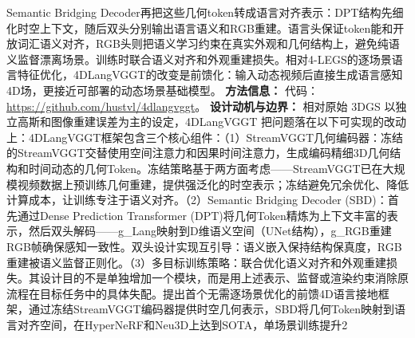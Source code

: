 Semantic Bridging Decoder再把这些几何token转成语言对齐表示：DPT结构先细化时空上下文，随后双头分别输出语言语义和RGB重建。语言头保证token能和开放词汇语义对齐，RGB头则把语义学习约束在真实外观和几何结构上，避免纯语义监督漂离场景。训练时联合语义对齐和外观重建损失。相对4-LEGS的逐场景语言特征优化，4DLangVGGT的改变是前馈化：输入动态视频后直接生成语言感知4D场，更接近可部署的动态场景基础模型。
\textbf{方法信息：} 代码：\url{https://github.com/hustvl/4dlangvggt}。
\textbf{设计动机与边界：} 相对原始 3DGS 以独立高斯和图像重建误差为主的设定，4DLangVGGT 把问题落在以下可实现的改动上：4DLangVGGT框架包含三个核心组件：（1）StreamVGGT几何编码器：冻结的StreamVGGT交替使用空间注意力和因果时间注意力，生成编码精细3D几何结构和时间动态的几何Token。冻结策略基于两方面考虑——StreamVGGT已在大规模视频数据上预训练几何重建，提供强泛化的时空表示；冻结避免冗余优化、降低计算成本，让训练专注于语义对齐。（2）Semantic Bridging Decoder (SBD)：首先通过Dense Prediction Transformer (DPT)将几何Token精炼为上下文丰富的表示，然后双头解码——g\_Lang映射到D维语义空间（UNet结构），g\_RGB重建RGB帧确保感知一致性。双头设计实现互引导：语义嵌入保持结构保真度，RGB重建被语义监督正则化。（3）多目标训练策略：联合优化语义对齐和外观重建损失。其设计目的不是单独增加一个模块，而是用上述表示、监督或渲染约束消除原流程在目标任务中的具体失配。提出首个无需逐场景优化的前馈4D语言接地框架，通过冻结StreamVGGT编码器提供时空几何表示，SBD将几何Token映射到语言对齐空间，在HyperNeRF和Neu3D上达到SOTA，单场景训练提升2%
